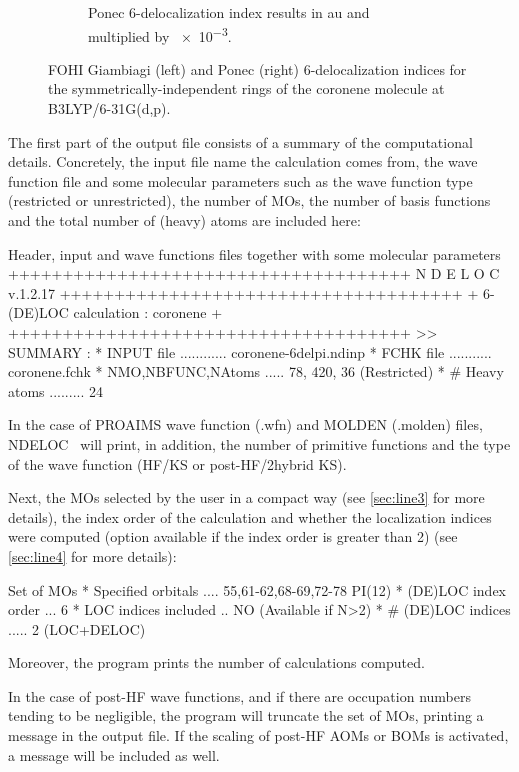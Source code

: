 \documentclass[a4paper,11pt,openany]{memoir}
\newcommand\programa{\textsc{NDELOC}}
\begin{document}
\begin{center}
\begin{figure}
\begin{subfigure}[b]{0.4\textwidth}
			\caption{{\small Ponec 6-delocalization index results in au and multiplied by \num{e-3}.}}
			\label{fig:CoronenePonec}
		\end{subfigure}
		\caption{\ac{FOHI} Giambiagi (left) and Ponec (right) 6-delocalization indices for the symmetrically-independent rings of the coronene molecule at B3LYP/6-31G(d,p).}\label{fig:Coronene6Dec}
	\end{figure}
\end{center}

The first part of the output file consists of a summary of the computational details. Concretely, the input file name the calculation comes from, the wave function file and some molecular parameters such as the wave function type (restricted or unrestricted), the number of \acp{MO}, the number of basis functions and the total number of (heavy) atoms are included here:
\begin{recuadro}{Header, input and wave functions files together with some molecular parameters}
+++++++++++++++++++++++++++++++++++++
        N D E L O C  v.1.2.17
+++++++++++++++++++++++++++++++++++++
+ 6-(DE)LOC calculation :  coronene +
+++++++++++++++++++++++++++++++++++++
>> SUMMARY :
* INPUT file ............ coronene-6delpi.ndinp
* FCHK   file ........... coronene.fchk
* NMO,NBFUNC,NAtoms ..... 78, 420, 36 (Restricted)
* # Heavy atoms ......... 24
\end{recuadro}
In the case of PROAIMS wave function (.wfn) and MOLDEN (.molden) files, \programa~ will print, in addition, the number of primitive functions and the type of the wave function (HF/KS or post-HF/2hybrid KS).

Next, the \acp{MO} selected by the user in a compact way (see \autoref{sec:line3} for more details), the index order of the calculation and whether the localization indices were computed (option available if the index order is greater than 2) (see \autoref{sec:line4} for more details):
\begin{recuadro}{Set of \acp{MO}}
* Specified orbitals .... 55,61-62,68-69,72-78 PI(12)
* (DE)LOC index order ... 6
* LOC indices included .. NO (Available if N>2)
* # (DE)LOC indices ..... 2 (LOC+DELOC)
\end{recuadro}
Moreover, the program prints the number of calculations computed.

In the case of post-HF wave functions, and if there are occupation numbers  tending to be negligible, the program will truncate the set of \acp{MO}, printing a message in the output file. If the scaling of post-HF \acp{AOM} or \acp{BOM} is activated, a message will be included as well.
\end{document}
